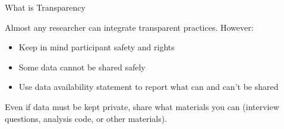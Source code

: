 \begin{block}{What is Transparency}
      
 
  

 
  
 
  
  Almost any researcher can integrate transparent practices. However:
\begin{itemize}
      \item Keep in mind participant safety and rights 
      \item Some data cannot be shared safely
      \item Use data availability statement to report what can and can't be shared
  \end{itemize} 
Even if data must be kept private, share what materials you can (interview questions, analysis code, or other materials). 
\end{block}

